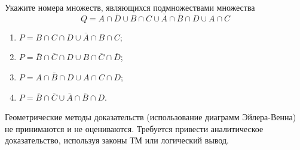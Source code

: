 \question
Укажите номера множеств, являющихся подмножествами множества
\begin{equation*}
	Q = A \cap \bar{D} \cup B \cap C \cup \bar{A} \cap \bar{B} \cap D \cup A \cap C
\end{equation*}

\begin{enumerate}
	\renewcommand{\labelenumi}{\arabic{enumi})}
	\item $P = B \cap C \cap D \cup \bar{A} \cap B \cap C$;
	\item $P = \bar{B} \cap \bar{C} \cap D \cup B \cap \bar{C} \cap \bar{D}$;
	\item $P = A \cap \bar{B} \cap D \cup A \cap C \cap D$;
	\item $P = \bar{B} \cap \bar{C} \cup \bar{A} \cap \bar{B} \cap D$.
\end{enumerate}

Геометрические методы доказательств (использование диаграмм Эйлера-Венна) не принимаются и не оцениваются. Требуется привести аналитическое доказательство, используя законы ТМ или логический вывод.
